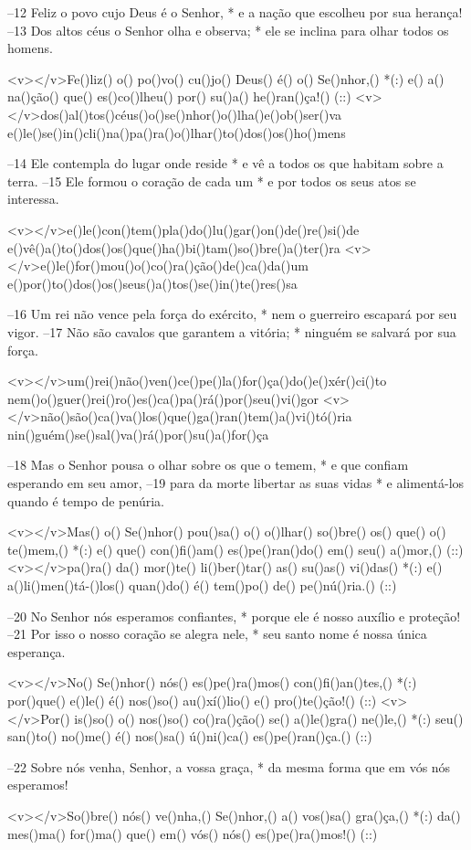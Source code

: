 –12 Feliz o povo cujo Deus é o Senhor, *
e a nação que escolheu por sua herança!
–13 Dos altos céus o Senhor olha e observa; *
ele se inclina para olhar todos os homens.

<v></v>Fe()liz() o() po()vo() cu()jo() Deus() é() o() Se()nhor,() *(:)
e() a() na()ção() que() es()co()lheu() por() su()a() he()ran()ça!() (::)
<v></v>dos()al()tos()céus()o()se()nhor()o()lha()e()ob()ser()va
e()le()se()in()cli()na()pa()ra()o()lhar()to()dos()os()ho()mens

–14 Ele contempla do lugar onde reside *
e vê a todos os que habitam sobre a terra.
–15 Ele formou o coração de cada um *
e por todos os seus atos se interessa.

<v></v>e()le()con()tem()pla()do()lu()gar()on()de()re()si()de
e()vê()a()to()dos()os()que()ha()bi()tam()so()bre()a()ter()ra
<v></v>e()le()for()mou()o()co()ra()ção()de()ca()da()um
e()por()to()dos()os()seus()a()tos()se()in()te()res()sa

–16 Um rei não vence pela força do exército, *
nem o guerreiro escapará por seu vigor.
–17 Não são cavalos que garantem a vitória; *
ninguém se salvará por sua força.

<v></v>um()rei()não()ven()ce()pe()la()for()ça()do()e()xér()ci()to
nem()o()guer()rei()ro()es()ca()pa()rá()por()seu()vi()gor
<v></v>não()são()ca()va()los()que()ga()ran()tem()a()vi()tó()ria
nin()guém()se()sal()va()rá()por()su()a()for()ça

–18 Mas o Senhor pousa o olhar sobre os que o temem, *
e que confiam esperando em seu amor,
–19 para da morte libertar as suas vidas *
e alimentá-los quando é tempo de penúria.

<v></v>Mas() o() Se()nhor() pou()sa() o() o()lhar() so()bre() os() que() o() te()mem,() *(:)
e() que() con()fi()am() es()pe()ran()do() em() seu() a()mor,() (::)
<v></v>pa()ra() da() mor()te() li()ber()tar() as() su()as() vi()das() *(:)
e() a()li()men()tá-()los() quan()do() é() tem()po() de() pe()nú()ria.() (::)

–20 No Senhor nós esperamos confiantes, *
porque ele é nosso auxílio e proteção!
–21 Por isso o nosso coração se alegra nele, *
seu santo nome é nossa única esperança.

<v></v>No() Se()nhor() nós() es()pe()ra()mos() con()fi()an()tes,() *(:)
por()que() e()le() é() nos()so() au()xí()lio() e() pro()te()ção!() (::)
<v></v>Por() is()so() o() nos()so() co()ra()ção() se() a()le()gra() ne()le,() *(:)
seu() san()to() no()me() é() nos()sa() ú()ni()ca() es()pe()ran()ça.() (::)

–22 Sobre nós venha, Senhor, a vossa graça, *
da mesma forma que em vós nós esperamos!

<v></v>So()bre() nós() ve()nha,() Se()nhor,() a() vos()sa() gra()ça,() *(:)
da() mes()ma() for()ma() que() em() vós() nós() es()pe()ra()mos!() (::)
